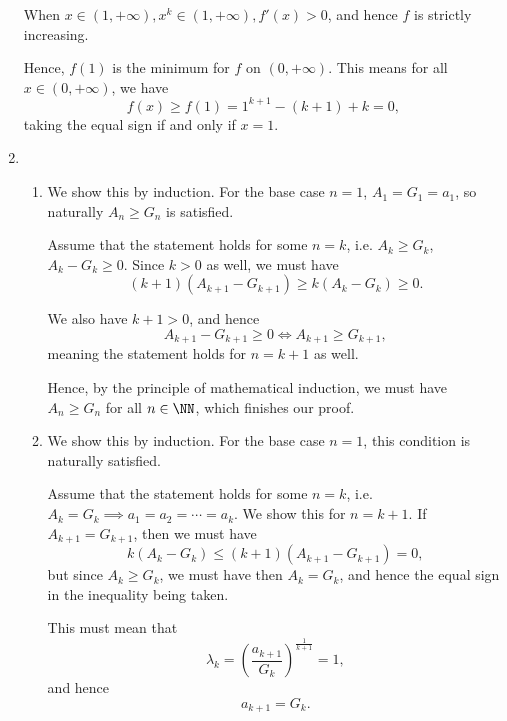 \begin{enumerate}
          When \(x \in (1, +\infty), x^k \in (1, +\infty), f'(x) > 0\), and hence \(f\) is strictly increasing.

          Hence, \(f(1)\) is the minimum for \(f\) on \((0, +\infty)\). This means for all \(x \in (0, +\infty)\), we have
          \[
              f(x) \geq f(1) = 1^{k + 1} - (k + 1) + k = 0,
          \]
          taking the equal sign if and only if \(x = 1\).

    \item \begin{enumerate}
              \item We show this by induction. For the base case \(n = 1\), \(A_1 = G_1 = a_1\), so naturally \(A_n \geq G_n\) is satisfied.

                    Assume that the statement holds for some \(n = k\), i.e. \(A_k \geq G_k\), \(A_k - G_k \geq 0\). Since \(k > 0\) as well, we must have
                    \[
                        (k + 1)(A_{k + 1} - G_{k + 1}) \geq k (A_k - G_k) \geq 0.
                    \]

                    We also have \(k + 1 > 0\), and hence
                    \[
                        A_{k + 1} - G_{k + 1} \geq 0 \iff A_{k + 1} \geq G_{k + 1},
                    \]
                    meaning the statement holds for \(n = k + 1\) as well.

                    Hence, by the principle of mathematical induction, we must have \(A_n \geq G_n\) for all \(n \in \NN\), which finishes our proof.

              \item We show this by induction. For the base case \(n = 1\), this condition is naturally satisfied.

                    Assume that the statement holds for some \(n = k\), i.e. \(A_k = G_k \implies a_1 = a_2 = \cdots = a_k\). We show this for \(n = k + 1\). If \(A_{k + 1} = G_{k + 1}\), then we must have
                    \[
                        k (A_k - G_k) \leq (k + 1)(A_{k + 1} - G_{k + 1}) = 0,
                    \]
                    but since \(A_k \geq G_k\), we must have then \(A_k = G_k\), and hence the equal sign in the inequality being taken.

                    This must mean that
                    \[
                        \lambda_{k} = \left(\frac{a_{k + 1}}{G_k}\right)^{\frac{1}{k + 1}} = 1,
                    \]
                    and hence
                    \[
                        a_{k + 1} = G_k.
                    \]


\end{enumerate}
\end{enumerate}
